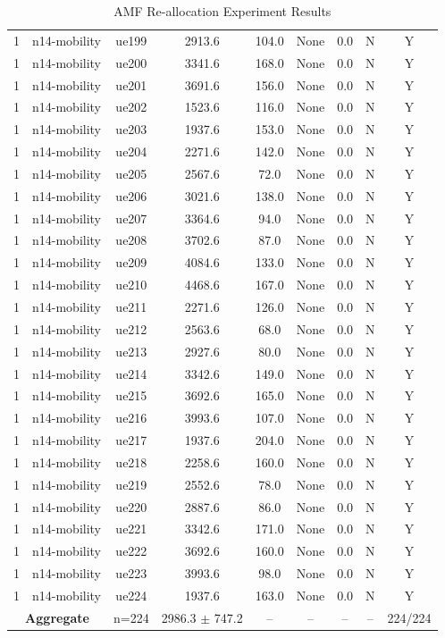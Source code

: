 \begin{table}[ht]
\begin{tabular}{|c|c|c|c|c|c|c|c|c|}
1 & n14-mobility & ue199 & 2913.6 & 104.0 & None & 0.0 & N & Y \\
1 & n14-mobility & ue200 & 3341.6 & 168.0 & None & 0.0 & N & Y \\
1 & n14-mobility & ue201 & 3691.6 & 156.0 & None & 0.0 & N & Y \\
1 & n14-mobility & ue202 & 1523.6 & 116.0 & None & 0.0 & N & Y \\
1 & n14-mobility & ue203 & 1937.6 & 153.0 & None & 0.0 & N & Y \\
1 & n14-mobility & ue204 & 2271.6 & 142.0 & None & 0.0 & N & Y \\
1 & n14-mobility & ue205 & 2567.6 & 72.0 & None & 0.0 & N & Y \\
1 & n14-mobility & ue206 & 3021.6 & 138.0 & None & 0.0 & N & Y \\
1 & n14-mobility & ue207 & 3364.6 & 94.0 & None & 0.0 & N & Y \\
1 & n14-mobility & ue208 & 3702.6 & 87.0 & None & 0.0 & N & Y \\
1 & n14-mobility & ue209 & 4084.6 & 133.0 & None & 0.0 & N & Y \\
1 & n14-mobility & ue210 & 4468.6 & 167.0 & None & 0.0 & N & Y \\
1 & n14-mobility & ue211 & 2271.6 & 126.0 & None & 0.0 & N & Y \\
1 & n14-mobility & ue212 & 2563.6 & 68.0 & None & 0.0 & N & Y \\
1 & n14-mobility & ue213 & 2927.6 & 80.0 & None & 0.0 & N & Y \\
1 & n14-mobility & ue214 & 3342.6 & 149.0 & None & 0.0 & N & Y \\
1 & n14-mobility & ue215 & 3692.6 & 165.0 & None & 0.0 & N & Y \\
1 & n14-mobility & ue216 & 3993.6 & 107.0 & None & 0.0 & N & Y \\
1 & n14-mobility & ue217 & 1937.6 & 204.0 & None & 0.0 & N & Y \\
1 & n14-mobility & ue218 & 2258.6 & 160.0 & None & 0.0 & N & Y \\
1 & n14-mobility & ue219 & 2552.6 & 78.0 & None & 0.0 & N & Y \\
1 & n14-mobility & ue220 & 2887.6 & 86.0 & None & 0.0 & N & Y \\
1 & n14-mobility & ue221 & 3342.6 & 171.0 & None & 0.0 & N & Y \\
1 & n14-mobility & ue222 & 3692.6 & 160.0 & None & 0.0 & N & Y \\
1 & n14-mobility & ue223 & 3993.6 & 98.0 & None & 0.0 & N & Y \\
1 & n14-mobility & ue224 & 1937.6 & 163.0 & None & 0.0 & N & Y \\
\multicolumn{2}{|c|}{\textbf{Aggregate}} & n=224 & 2986.3 $\pm$ 747.2 & -- & -- & -- & -- & 224/224 \\
\hline
\end{tabular}
\caption{AMF Re-allocation Experiment Results}
\label{tab:amf_realloc}
\end{table}
